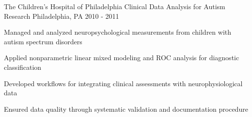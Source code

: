 \begin{cventries}
    \cventry
      {The Children's Hospital of Philadelphia} %
      {Clinical Data Analysis for Autism Research} %
      {Philadelphia, PA} %
      {2010 - 2011} %
      {
        \begin{cvitems} %
          \item {Managed and analyzed neuropsychological measurements from children with autism spectrum disorders}
          \item {Applied nonparametric linear mixed modeling and ROC analysis for diagnostic classification}
          \item {Developed workflows for integrating clinical assessments with neurophysiological data}
          \item {Ensured data quality through systematic validation and documentation procedure}
        \end{cvitems}
      }

  \end{cventries}
